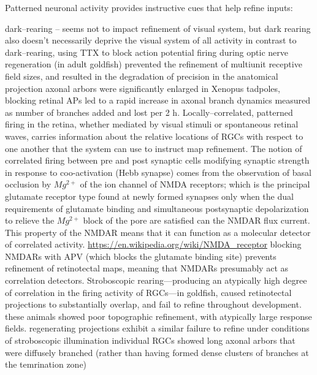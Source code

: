 \documentclass[11pt, a4paper, oneside]{article}   	%
\begin{document}
\begin{outline}
 \point Patterned neuronal activity provides instructive cues that help refine inputs:

  \subpoint dark--rearing -- seems not to impact refinement of visual system, but dark rearing also doesn't necessarily deprive the visual system of all activity
    \subpoint in contrast to dark--rearing, using TTX to block action potential firing during optic nerve regeneration (in adult goldfish) prevented the refinement of multiunit receptive field sizes, and resulted in the degradation of precision in the anatomical projection
      \subsubpoint axonal arbors were significantly enlarged
        \supersubpoint in Xenopus tadpoles, blocking retinal APs led to a rapid increase in axonal branch dynamics measured as number of branches added and lost per 2 h.
    \subpoint Locally--correlated, patterned firing in the retina, whether mediated by visual stimuli or spontaneous retinal waves, carries information about the relative locations of RGCs with respect to one another that the system can use to instruct map refinement.
      \subsubpoint The notion of correlated firing between pre and post synaptic cells modifying synaptic strength in response to coo-activation (Hebb synapse) comes from the observation of basal occlusion by $Mg^{2+}$ of the ion channel of NMDA receptors; which is the principal glutamate receptor type found at newly formed synapses
        \supersubpoint only when the dual requirements of glutamate binding and simultaneous postsynaptic depolarization to relieve the $Mg^{2+}$ block of the pore are satisfied can the NMDAR flux current. This property of the NMDAR means that it can function as a molecular detector of correlated activity.
        \supersubpoint \url{https://en.wikipedia.org/wiki/NMDA_receptor}
      \subsubpoint blocking NMDARs with APV (which blocks the glutamate binding site) prevents refinement of retinotectal maps, meaning that NMDARs presumably act as correlation detectors.
    \subpoint Stroboscopic rearing---producing an atypically high degree of correlation in the firing activity of RGCs---in goldfish, caused retinotectal projections to substantially overlap, and fail to refine throughout development.
        \subsubpoint these animals showed poor topographic refinement, with atypically large response fields.
            \supersubpoint regenerating projections exhibit a similar failure to refine under conditions of stroboscopic illumination
        \subsubpoint individual RGCs showed long axonal arbors that were diffusely branched (rather than having formed dense clusters of branches at the temrination zone)

\end{outline}
\end{document}
